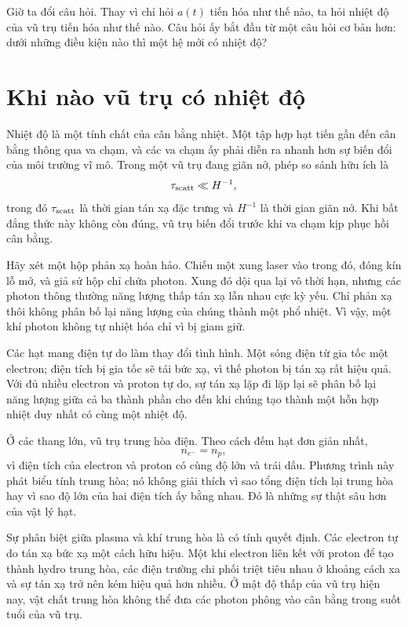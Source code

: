 Giờ ta đổi câu hỏi. Thay vì chỉ hỏi \(a(t)\) tiến hóa như thế nào, ta hỏi nhiệt độ của vũ trụ tiến hóa như thế nào. Câu hỏi ấy bắt đầu từ một câu hỏi cơ bản hơn: dưới những điều kiện nào thì một hệ mới có nhiệt độ?

\section{Khi nào vũ trụ có nhiệt độ}

Nhiệt độ là một tính chất của cân bằng nhiệt. Một tập hợp hạt tiến gần đến cân bằng thông qua va chạm, và các va chạm ấy phải diễn ra nhanh hơn sự biến đổi của môi trường vĩ mô. Trong một vũ trụ đang giãn nở, phép so sánh hữu ích là
\begin{equation}
\tau_{\rm scatt}\ll H^{-1},
\label{eq:c07-equilibrium-condition}
\end{equation}
trong đó \(\tau_{\rm scatt}\) là thời gian tán xạ đặc trưng và \(H^{-1}\) là thời gian giãn nở. Khi bất đẳng thức này không còn đúng, vũ trụ biến đổi trước khi va chạm kịp phục hồi cân bằng.

Hãy xét một hộp phản xạ hoàn hảo. Chiếu một xung laser vào trong đó, đóng kín lỗ mở, và giả sử hộp chỉ chứa photon. Xung đó dội qua lại vô thời hạn, nhưng các photon thông thường năng lượng thấp tán xạ lẫn nhau cực kỳ yếu. Chỉ phản xạ thôi không phân bố lại năng lượng của chúng thành một phổ nhiệt. Vì vậy, một khí photon không tự nhiệt hóa chỉ vì bị giam giữ.

Các hạt mang điện tự do làm thay đổi tình hình. Một sóng điện từ gia tốc một electron; điện tích bị gia tốc sẽ tái bức xạ, vì thế photon bị tán xạ rất hiệu quả. Với đủ nhiều electron và proton tự do, sự tán xạ lặp đi lặp lại sẽ phân bố lại năng lượng giữa cả ba thành phần cho đến khi chúng tạo thành một hỗn hợp nhiệt duy nhất có cùng một nhiệt độ.

Ở các thang lớn, vũ trụ trung hòa điện. Theo cách đếm hạt đơn giản nhất,
\begin{equation}
n_{e^-}=n_p,
\label{eq:c07-neutrality}
\end{equation}
vì điện tích của electron và proton có cùng độ lớn và trái dấu. Phương trình này phát biểu tính trung hòa; nó không giải thích vì sao tổng điện tích lại trung hòa hay vì sao độ lớn của hai điện tích ấy bằng nhau. Đó là những sự thật sâu hơn của vật lý hạt.

Sự phân biệt giữa plasma và khí trung hòa là có tính quyết định. Các electron tự do tán xạ bức xạ một cách hữu hiệu. Một khi electron liên kết với proton để tạo thành hydro trung hòa, các điện trường chi phối triệt tiêu nhau ở khoảng cách xa và sự tán xạ trở nên kém hiệu quả hơn nhiều. Ở mật độ thấp của vũ trụ hiện nay, vật chất trung hòa không thể đưa các photon phông vào cân bằng trong suốt tuổi của vũ trụ.

